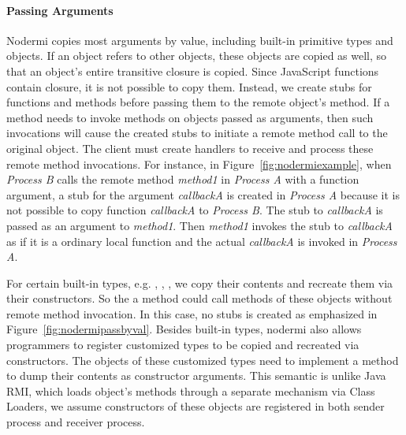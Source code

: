 \nodrmipassbyreffig{}
\nodrmipassbyvalfig{}


\paragraph{Passing Arguments}
Nodermi copies most arguments by value, including built-in primitive types
and objects.  If an object refers to other objects, these objects are copied 
as well, so that an object's entire transitive closure is copied.
Since JavaScript functions contain closure, it is not possible to copy them.
Instead, we create stubs for functions and methods before passing them
to the remote object's method.  If a method needs to invoke 
methods on objects passed as arguments, then such invocations
will cause the created stubs to initiate a remote method
call to the original object.  The client must create handlers
to receive and process these remote method invocations.
For instance, in Figure~\ref{fig:nodermiexample}, 
when \emph{Process B} calls the remote method \emph{method1}
in \emph{Process A} with a function argument,
a stub for the argument
\emph{callbackA} is created in \emph{Process A} because
it is not possible to copy function \emph{callbackA} to \emph{Process B}.
The stub to \emph{callbackA} is passed as an argument to
 \emph{method1}.
Then \emph{method1} invokes the stub to \emph{callbackA} as if it is a ordinary
 local function and the actual \emph{callbackA} is invoked in \emph{Process A}. 


For certain built-in types, e.g. , , , 
we copy their contents and recreate them via their constructors.
So the a method could call methods of these objects without 
remote method invocation.
In this case, no stubs is created as emphasized in Figure~\ref{fig:nodermipassbyval}.
Besides built-in types, nodermi also allows programmers to
register customized types to be copied and recreated via constructors.
The objects of these customized types need to implement a method to dump
their contents as constructor arguments.
This semantic is unlike Java RMI\cite{j2eedoc}, which loads
object's methods through a separate mechanism via Class Loaders,
we assume constructors of these objects are registered in
both sender process and receiver process.

